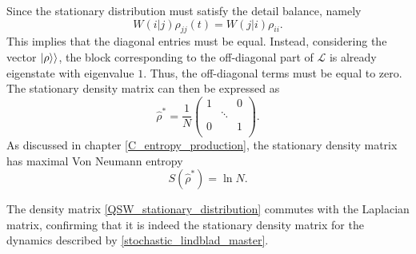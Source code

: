 Since the stationary distribution must satisfy the detail balance, namely
\begin{equation}
    W(i|j)\rho_{jj}(t) = W(j|i)\rho_{ii}.
\end{equation}
This implies that the diagonal entries must be equal. 
Instead, considering the vector $\lvert\rho\rangle\rangle$, the block corresponding to the off-diagonal part of $\mathcal{L}$ is already eigenstate with eigenvalue $1$. Thus, the off-diagonal terms must be equal to zero.
The stationary density matrix can then be expressed as
\begin{equation}\label{QSW_stationary_distribution}
    \hat\rho^* = \frac{1}{N}\begin{pmatrix}
        1&&0\\
        &\ddots&\\
        0&&1\\
    \end{pmatrix}.
\end{equation}
As discussed in chapter \ref{C_entropy_production}, the stationary density matrix has maximal Von Neumann entropy 
\begin{equation}
    S\left(\hat\rho^*\right) = \ln N.
\end{equation}

The density matrix \eqref{QSW_stationary_distribution} commutes with the Laplacian matrix, confirming that it is indeed the stationary density matrix for the dynamics described by \eqref{stochastic_lindblad_master}.

\begin{comment}
    Instead, adding also the coherent part, we need to go in the basis $\{\ket{\lambda}\}$ eigenvector of $\hat L$. 
    The decoherent part becomes
    \begin{equation}
    \begin{split}
    \mathcal{L}^{cl}\ket{\lambda}\bra{\lambda} &= \sum_{ij}\gamma_{ij}\left[\hat J_{ij} \ket{\lambda}\bra{\lambda}\hat J_{ij}^\dagger -\frac{1}{2} \left\{ \hat J_{ij}^\dagger \hat J_{ij}, \ket{\lambda}\bra{\lambda}\right\}\right]\\
        &= \sum_{ij}\gamma_{ij}\left[\ket{i}\braket{j}{\lambda}\braket{\lambda}{j}\bra{i} -\frac{1}{2}\ket{j}\braket{i}{i}\braket{j}{\lambda}\bra{\lambda} - \frac{1}{2}\ket{\lambda}\braket{\lambda}{j}\braket{i}{i}\bra{j} \right]\\
        & = \sum_{ij}\gamma_{ij}\left[|\braket{j}{\lambda}|^2\ket{i}\bra{i} -\frac{1}{2}\ket{j}\braket{j}{\lambda}\bra{\lambda} - \frac{1}{2}\ket{\lambda}\braket{\lambda}{j}\bra{j} \right]\\
        &= \sum_{ij}\left[\pi_{ij}\rho_j\ket{i}\bra{i} -\frac{\pi_{ij}}{2}\braket{j}{\lambda}\ket{j}\bra{\lambda} - \frac{\pi_{ij}}{2}\braket{\lambda}{j}\ket{\lambda}\bra{j} \right]
    \end{split}
\end{equation}
\end{comment}
